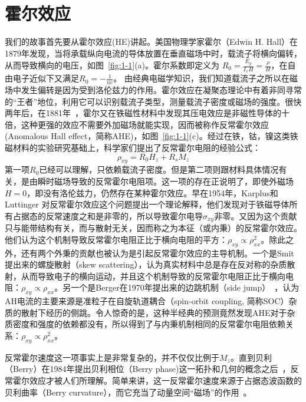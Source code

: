 \section{霍尔效应}
我们的故事首先要从霍尔效应(HE)讲起。美国物理学家霍尔（Edwin H. Hall）在1879年发现\citep{hall1879}，当将承载纵向电流的导体放置在垂直磁场中时，载流子将横向偏转，从而导致横向的电压，如图~\ref{fig:1-1}(a)。霍尔系数即定义为 $R_0=\frac{E_y}{I_x H}=\frac{\rho}{H}$，在自由电子近似下又满足$R_0=-\frac{1}{ne}$。
由经典电磁学知识，我们知道载流子之所以在磁场中发生偏转是因为受到洛伦兹力的作用。霍尔效应在凝聚态理论中有着非同寻常的“王者”地位，利用它可以识别载流子类型，测量载流子密度或磁场的强度。很快两年后，在1881年~\citep{hall1881}，霍尔又在铁磁性材料中发现其压电效应是非磁性导体的十倍，这种更强的效应不需要外加磁场就能实现，因而被称作反常霍尔效应(Anomalous Hall effect，简称AHE)，如图~\ref{fig:1-1}(c)。经过在铁，钴，镍这类铁磁材料的实验研究基础上，科学家们\citep{Pugh1930,Pugh1932}提出了反常霍尔电阻的经验公式：
\begin{equation}
    \label{eq:1-1}
    \rho_{x y}=R_{0} H_{z}+R_{s} M_{z}
\end{equation}
第一项$R_0$已经可以理解，只依赖载流子密度。但是第二项则跟材料具体情况有关，是由瞬时磁场导致的反常霍尔电阻项。这一项的存在正说明了，即使外磁场$H=0$，即没有洛伦兹力，仍然存在某种霍尔效应。早在1954年，Karplus和Luttinger \citep{karplus54}对反常霍尔效应这个问题提出一个理论解释，他们发现对于铁磁导体所有占据态的反常速度之和是非零的，所以导致霍尔电导$\sigma_{xy}$非零。又因为这个贡献只与能带结构有关，而与散射无关，因而称之为本征（或内秉）的反常霍尔效应。他们认为这个机制导致反常霍尔电阻正比于横向电阻的平方：$\rho_{x y} \propto \rho_{x x}^{2}$。除此之外，还有两个外秉的贡献也被认为是引起反常霍尔效应的主导机制。一个是Smit提出来的螺旋散射（skew scattering）\citep{SMIT1955877,SMIT195839}，认为真实材料中总是存在反对称的杂质散射，从而导致电子的横向运动，并且这个机制导致的反常霍尔电阻正比于横向电阻：$\rho_{x y} \propto \rho_{x x}$。另一个是Berger在1970年提出来的边跳机制（side jump）~\citep{Berger1970}，认为AH电流的主要来源是准粒子在自旋轨道耦合（spin-orbit coupling, 简称SOC）杂质的散射下经历的侧跳。令人惊奇的是，这种半经典的预测竟然发现AHE对于杂质密度和强度的依赖都没有，所以得到了与内秉机制相同的反常霍尔电阻依赖关系：$\rho_{x y} \propto \rho_{x x}^{2}$。

反常霍尔速度这一项事实上是非常复杂的，并不仅仅比例于$M_z$。直到贝利（Berry）在1984年提出贝利相位（Berry phase)这一拓扑和几何的概念之后~\citep{Berry1802}，反常霍尔效应才被人们所理解。简单来讲，这一反常霍尔速度来源于占据态波函数的贝利曲率（Berry curvature），而它充当了动量空间“磁场”的作用~\citep{MacDonald}。

